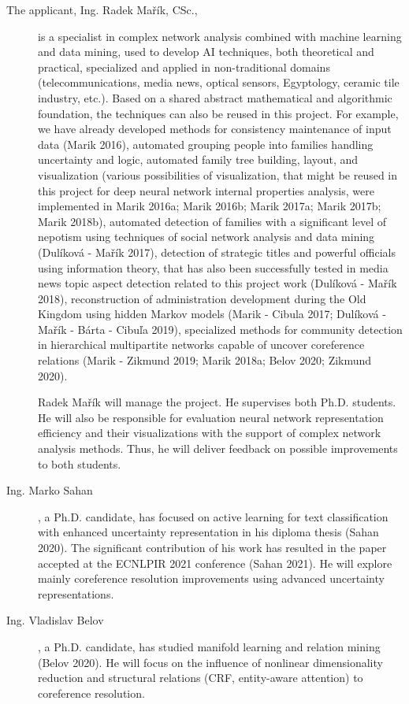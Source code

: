 \begin{description}
	\item [The applicant, Ing. Radek Mařík, CSc.,]  is a specialist in complex network analysis combined with machine learning and data mining, used to develop AI techniques, both theoretical and practical, specialized and applied in non-traditional domains (telecommunications, media news, optical sensors, Egyptology, ceramic tile industry, etc.). Based on a shared abstract mathematical and algorithmic foundation, the techniques can also be reused in this project. For example, we have already developed methods for consistency maintenance of input data (Marik 2016), automated grouping people into families handling uncertainty and logic, automated family tree building, layout, and visualization (various possibilities of visualization, that might be reused in this project for deep neural network internal properties analysis, were implemented in Marik 2016a; Marik 2016b; Marik 2017a; Marik 2017b; Marik 2018b), automated detection of families with a significant level of nepotism using techniques of social network analysis and data mining (Dulíková - Mařík 2017), detection of strategic titles and powerful officials using information theory, that has also been successfully tested in media news topic aspect detection related to this project work (Dulíková - Mařík 2018), reconstruction of administration development during the Old Kingdom using hidden Markov models (Marik - Cibula 2017; Dulíková - Mařík - Bárta - Cibuľa 2019), specialized methods for community detection in hierarchical multipartite networks capable of uncover coreference relations (Marik - Zikmund 2019; Marik 2018a; Belov 2020; Zikmund 2020). 
	
Radek Mařík will manage the project. He supervises both Ph.D. students. He will also be responsible for evaluation neural network representation efficiency and their visualizations with the support of complex network analysis methods. Thus, he will deliver feedback on possible improvements to both students.

\item [Ing. Marko Sahan], a Ph.D. candidate, has focused on active learning for text classification with enhanced uncertainty representation in his diploma thesis (Sahan 2020). The significant contribution of his work has resulted in the paper accepted at the ECNLPIR 2021 conference (Sahan 2021). He will explore mainly coreference resolution improvements using advanced uncertainty representations.

\item [Ing. Vladislav Belov], a Ph.D. candidate, has studied manifold learning and relation mining (Belov 2020). He will focus on the influence of nonlinear dimensionality reduction and structural relations (CRF, entity-aware attention) to coreference resolution.

\end{description}

